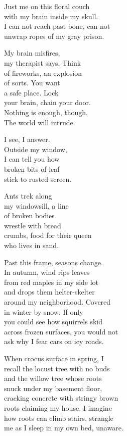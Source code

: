 \documentclass[twoside,10pt]{book}
\begin{document}
Just me on this floral couch\\
with my brain inside my skull.\\
I can not reach past bone, can not\\
unwrap ropes of my gray prison.

My brain misfires,\\
my therapist says. Think\\
of fireworks, an explosion\\
of sorts. You want\\
a safe place. Lock\\
your brain, chain your door.\\
Nothing is enough, though.\\
The world will intrude.

I see, I answer.\\
Outside my window,\\
I can tell you how\\
broken bits of leaf\\
stick to rusted screen.

Ants trek along\\
my windowsill, a line\\
of broken bodies\\
wrestle with bread\\
crumbs, food for their queen\\
who lives in sand.

Past this frame, seasons change.\\
In autumn, wind rips leaves\\
from red maples in my side lot\\
and drops them helter-skelter\\
around my neighborhood. Covered\\
in winter by snow. If only\\
you could see how squirrels skid\\
across frozen surfaces, you would not\\
ask why I fear cars on icy roads.

When crocus surface in spring, I\\
recall the locust tree with no buds\\
and the willow tree whose roots\\
snuck under my basement floor,\\
cracking concrete with stringy brown\\
roots claiming my house. I imagine\\
how roots can climb stairs, strangle\\
me as I sleep in my own bed, unaware.
\end{document}
